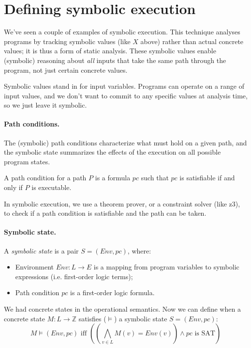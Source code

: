 \documentclass[11pt]{article}
\begin{document}
\section*{Defining symbolic execution}
We've seen a couple of examples of symbolic execution.
This technique analyses programs by tracking symbolic values (like $X$
above) rather than actual concrete values; it is thus a form of static
analysis. These symbolic values enable (symbolic) reasoning about
\emph{all} inputs that take the same path through the program, not
just certain concrete values.

Symbolic values stand in for input variables. Programs can operate on
a range of input values, and we don't want to commit to any specific
values at analysis time, so we just leave it symbolic.

\paragraph{Path conditions.} The (symbolic) path conditions characterize what must
hold on a given path, and the symbolic state summarizes the effects
of the execution on all possible program states.

A path condition for a path $P$ is a formula $\mathit{pc}$
such that $\mathit{pc}$ is satisfiable if and only if $P$ is
executable.

In symbolic execution, we use a theorem prover, or a constraint solver (like z3),
to check if a path condition is satisfiable and the path can be taken.

\paragraph{Symbolic state.} A \emph{symbolic state} is a pair $S = (\mathit{Env}, \mathit{pc})$, where:
\begin{itemize}[noitemsep]
\item Environment $\mathit{Env}: L \rightarrow E$ is a mapping from program variables to symbolic expressions (i.e. first-order logic terms);
\item Path condition $\mathit{pc}$ is a first-order logic formula.
\end{itemize}

We had concrete states in the operational semantics. Now we can define when a concrete state $M : L \rightarrow \mathbb{Z}$ satisfies ($\models$) a symbolic state $S = (\mathit{Env}, \mathit{pc})$:
\[ M \models (\mathit{Env}, \mathit{pc}) \mbox{ iff } \left( (\bigwedge_{v \in L} M(v) = \mathit{Env}(v)) \wedge \mbox{$\mathit{pc}$ is SAT} \right) \]
\end{document}

